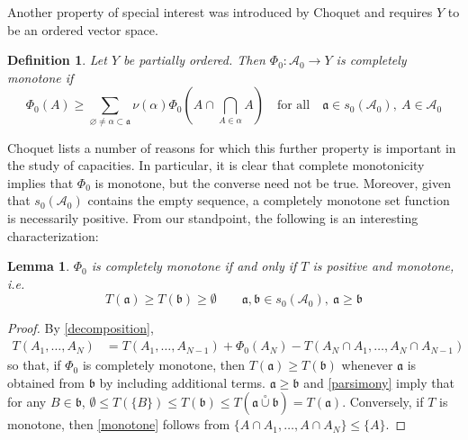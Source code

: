 \documentclass[11pt]{amsart}
\theoremstyle{plain}
\newtheorem{definition}{Definition}
\newtheorem{lemma}{Lemma}
\begin{document}
Another property of special interest was introduced by Choquet \cite{choquet} and 
requires $Y$ to be an ordered vector space. 

\begin{definition}
\label{def monotone}
Let $Y$ be partially ordered. Then $\Phi_0:{\mathscr{A}}_0\to Y$  is completely monotone if
\begin{equation}
\label{monotone}
\Phi_0(A)
\ge
\sum_{{\varnothing}\ne\alpha\subset{\mathfrak a}}\nu(\alpha)\Phi_0\left(A\cap\bigcap_{A\in\alpha}A\right)
\quad\text{for all}\quad
{\mathfrak a}\in s_0({\mathscr{A}}_0),\ A\in{\mathscr{A}}_0
\end{equation}
\end{definition}

Choquet lists a number of reasons for which this further property is important in 
the study of capacities. In particular, it is clear that complete monotonicity implies 
that $\Phi_0$ is monotone, but the converse need not be true. Moreover, given that 
$s_0({\mathscr{A}}_0)$ contains the empty sequence, a completely monotone set function is
necessarily positive. From our standpoint, the following is an interesting characterization:

\begin{lemma}
\label{lemma choquet}
$\Phi_0$ is completely monotone if and only if $T$ is positive and monotone, i.e.
\begin{equation}
T({\mathfrak a})\ge T({\mathfrak b})\ge{\emptyset}
\qquad{\mathfrak a},{\mathfrak b}\in s_0({\mathscr{A}}_0),\ {\mathfrak a}\ge{\mathfrak b}
\end{equation}
\end{lemma}

\begin{proof}
By \eqref{decomposition},
\begin{align*}
T(A_1,\ldots,A_N)
&=
T(A_1,\ldots,A_{N-1})+\Phi_0(A_N)-T(A_N\cap A_1,\ldots,A_N\cap A_{N-1})
\end{align*}
so that, if $\Phi_0$ is completely monotone, then $T({\mathfrak a})\ge T({\mathfrak b})$ 
whenever ${\mathfrak a}$ is obtained from ${\mathfrak b}$ by including additional terms. ${\mathfrak a}\ge{\mathfrak b}$   
and \eqref{parsimony} imply that for any $B\in{\mathfrak b}$, 
${\emptyset} \le T(\{B\})\le T({\mathfrak b})\le T({\mathfrak a}{\overset\circ\cup}{\mathfrak b})=T({\mathfrak a})$. 
Conversely, if $T$ is monotone, then \eqref{monotone} follows from 
$\{A\cap A_1,\ldots,A\cap A_N\}\le\{A\}$.
\end{proof}
\end{document}
